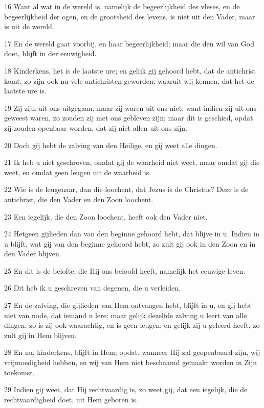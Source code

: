 \par 16 Want al wat in de wereld is, namelijk de begeerlijkheid des vleses, en de begeerlijkheid der ogen, en de grootsheid des levens, is niet uit den Vader, maar is uit de wereld.
\par 17 En de wereld gaat voorbij, en haar begeerlijkheid; maar die den wil van God doet, blijft in der eeuwigheid.
\par 18 Kinderkens, het is de laatste ure; en gelijk gij gehoord hebt, dat de antichrist komt, zo zijn ook nu vele antichristen geworden; waaruit wij kennen, dat het de laatste ure is.
\par 19 Zij zijn uit ons uitgegaan, maar zij waren uit ons niet; want indien zij uit ons geweest waren, zo zouden zij met ons gebleven zijn; maar dit is geschied, opdat zij zouden openbaar worden, dat zij niet allen uit ons zijn.
\par 20 Doch gij hebt de zalving van den Heilige, en gij weet alle dingen.
\par 21 Ik heb u niet geschreven, omdat gij de waarheid niet weet, maar omdat gij die weet, en omdat geen leugen uit de waarheid is.
\par 22 Wie is de leugenaar, dan die loochent, dat Jezus is de Christus? Deze is de antichrist, die den Vader en den Zoon loochent.
\par 23 Een iegelijk, die den Zoon loochent, heeft ook den Vader niet.
\par 24 Hetgeen gijlieden dan van den beginne gehoord hebt, dat blijve in u. Indien in u blijft, wat gij van den beginne gehoord hebt, zo zult gij ook in den Zoon en in den Vader blijven.
\par 25 En dit is de belofte, die Hij ons beloofd heeft, namelijk het eeuwige leven.
\par 26 Dit heb ik u geschreven van degenen, die u verleiden.
\par 27 En de zalving, die gijlieden van Hem ontvangen hebt, blijft in u, en gij hebt niet van node, dat iemand u lere; maar gelijk dezelfde zalving u leert van alle dingen, zo is zij ook waarachtig, en is geen leugen; en gelijk zij u geleerd heeft, zo zult gij in Hem blijven.
\par 28 En nu, kinderkens, blijft in Hem; opdat, wanneer Hij zal geopenbaard zijn, wij vrijmoedigheid hebben, en wij van Hem niet beschaamd gemaakt worden in Zijn toekomst.
\par 29 Indien gij weet, dat Hij rechtvaardig is, zo weet gij, dat een iegelijk, die de rechtvaardigheid doet, uit Hem geboren is.

